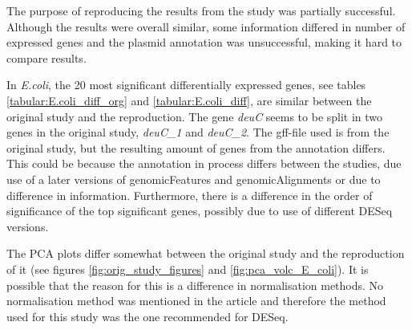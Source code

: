 







The purpose of reproducing the results from the study was partially successful. Although the results were overall similar, some information differed in number of expressed genes and the plasmid annotation was unsuccessful, making it hard to compare results.  

In \textit{E.coli}, the 20 most significant differentially expressed genes, see tables \ref{tabular:E.coli_diff_org} and \ref{tabular:E.coli_diff}, are similar between the original study and the reproduction. The gene \textit{deuC} seems to be split in two genes in the original study, \textit{deuC\_1} and \textit{deuC\_2}. The gff-file used is from the original study, but the resulting amount of genes from the annotation differs. This could be because the annotation in process differs between the studies, due use of a later versions of genomicFeatures and genomicAlignments or due to difference in information.  Furthermore, there is a difference in the order of significance of the top significant genes, possibly due to use of different DESeq versions.

The PCA plots differ somewhat between the original study and the reproduction of it (see figures \ref{fig:orig_study_figures} and \ref{fig:pca_volc_E_coli}). It is possible that the reason for this is a difference in normalisation methods. No normalisation method was mentioned in the article and therefore the method used for this study was the one recommended for DESeq.

